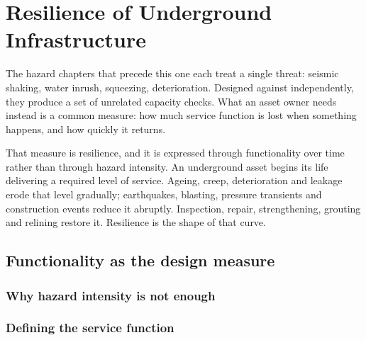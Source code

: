 \chapter{Resilience of Underground Infrastructure}
\label{ch:resilience}

The hazard chapters that precede this one each treat a single threat: seismic
shaking, water inrush, squeezing, deterioration. Designed against
independently, they produce a set of unrelated capacity checks. What an asset
owner needs instead is a common measure: how much service function is lost when
something happens, and how quickly it returns.

That measure is resilience, and it is expressed through functionality over
time rather than through hazard intensity. An underground asset begins its life
delivering a required level of service. Ageing, creep, deterioration and
leakage erode that level gradually; earthquakes, blasting, pressure transients
and construction events reduce it abruptly. Inspection, repair, strengthening,
grouting and relining restore it. Resilience is the shape of that curve.

\section{Functionality as the design measure}
\label{sec:functionality-measure}

\subsection{Why hazard intensity is not enough}
\label{sec:beyond-hazard}

\subsection{Defining the service function}
\label{sec:service-function}

